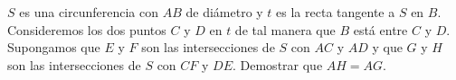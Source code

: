 $S$ es una circunferencia con $AB$ de diámetro y $t$ es la recta tangente a $S$ en $B$. Consideremos los dos puntos $C$ y $D$ en $t$ de tal manera que $B$ está entre $C$ y $D$. Supongamos que $E$ y $F$ son las intersecciones de $S$ con $AC$ y $AD$ y que $G$ y $H$ son las intersecciones de $S$ con $CF$ y $DE$. Demostrar que $AH=AG$.
